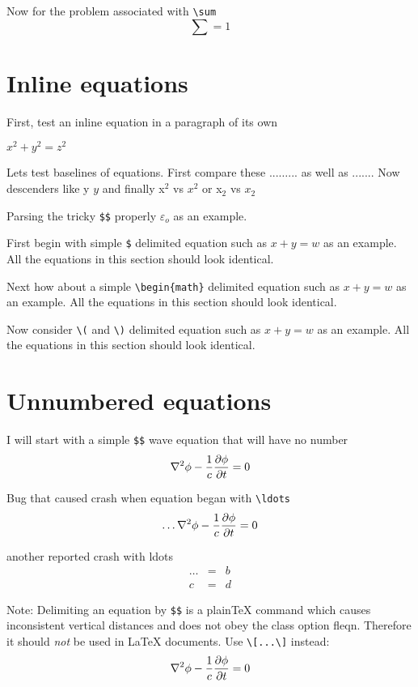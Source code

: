 \documentclass{article}
\begin{document}
Now for the problem associated with \verb#\sum#
$$
\sum = 1
$$

\section{Inline equations}
First, test an inline equation in a paragraph of its own

$x^2+y^2=z^2$

Lets test baselines of equations.  First compare these ...$\ldots$... as
well as ...$.$...  Now descenders like y $y$ and finally x$^2$ vs $x^2$ or
x$_2$ vs $x_2$

Parsing the tricky \verb#$$# properly $\varepsilon $$_o$ as an example.

First begin with simple \verb#$# delimited equation such as
$x+y=w$ as an example.  All the equations in this section should
look identical.

Next how about a simple \verb#\begin{math}# delimited equation such as
\begin{math}x+y=w\end{math} as an example.  All the equations in this section should
look identical.

Now consider \verb#\(# and \verb#\)# delimited equation such as
\(x+y=w\) as an example.  All the equations in this section should
look identical.

\section{Unnumbered equations}

I will start with a simple \verb#$$# wave equation
that will have no number
$$
\nabla^2 \phi -{1\over c} {\partial \phi\over \partial t}  = 0
$$

Bug that caused crash when equation began with \verb#\ldots#
$$
\ldots\nabla^2 \phi -{1\over c} {\partial \phi\over \partial t}  = 0
$$

another reported crash with ldots
\begin{eqnarray*} 
\ldots & = & b \\
c      & = & d
\end{eqnarray*} 

Note: Delimiting an equation by \verb|$$| is a plain\TeX{} command
which causes inconsistent vertical distances and does not obey
the class option \textsf{fleqn}.
Therefore it should \emph{not} be used in \LaTeX{} documents. Use
\verb#\[...\]# instead:
\[
\nabla^2 \phi -{1\over c} {\partial \phi\over \partial t}  = 0
\]
\end{document}

